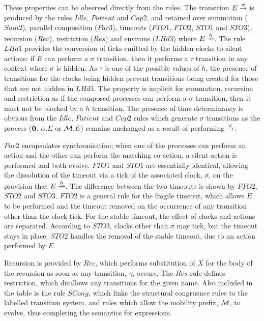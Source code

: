 These properties can be observed directly from the rules.  The
transition $E \stackrel{\sigma}{\rightarrow}$ is produced by the rules $Idle$,
$Patient$ and $Cap2$, and retained over summation ($Sum2$), parallel
composition ($Par3$), timeouts ($FTO1$, $FTO2$, $STO1$ and $STO3$),
recursion ($Rec$), restriction ($Res$) and environs ($LHd3$) where $E
\stackrel{h}{\nrightarrow}$.  The rule $LHd1$ provides the conversion of ticks
emitted by the hidden clocks to silent actions: if $E$ can perform a
$\sigma$ transition, then it performs a $\tau$ transition in any
context where $\sigma$ is hidden.  As $\tau$ is one of the possible
values of $h$, the presence of transitions for the clocks being hidden
prevent transitions being created for those that are not hidden in
$LHd3$.  The property is implicit for summation, recursion and
restriction as if the composed processes can perform a $\sigma$
transition, then it must not be blocked by a $h$ transition.  The
presence of time determinancy is obvious from the $Idle$, $Patient$
and $Cap2$ rules which generate $\sigma$ transitions as the process
($\textbf{0}$, $\alpha.E$ or $\text{$\mathcal{M}$}.E$) remains unchanged as a result of
performing $\stackrel{\sigma}{\rightarrow}$.

$Par2$ encapsulates synchronisation; when one of the processes can
perform an action and the other can perform the matching co-action, a
silent action is performed and both evolve.  $FTO1$ and $STO1$ are
essentially identical, allowing the dissolution of the timeout via a
tick of the associated clock, $\sigma$, on the provision that $E
\stackrel{h}{\nrightarrow}$.  The difference between the two timeouts is shown by
$FTO2$, $STO2$ and $STO3$.  $FTO2$ is a general rule for the fragile
timeout, which allows $E$ to be performed and the timeout removed on
the occurrence of any transition other than the clock tick.  For the
stable timeout, the effect of clocks and actions are separated.
According to $STO3$, clocks other than $\sigma$ may tick, but the
timeout stays in place.  $STO2$ handles the removal of the stable
timeout, due to an action performed by $E$.

Recursion is provided by $Rec$, which performs substitution of $X$ for
the body of the recursion as soon as any transition, $\gamma$, occurs.
The $Res$ rule defines restriction, which disallows any transitions
for the given name.  Also included in the table is the rule $SCong$,
which links the structural congruence rules to the labelled transition
system, and rules which allow the mobility prefix, $\text{$\mathcal{M}$}$, to
evolve, thus completing the semantics for expressions.

